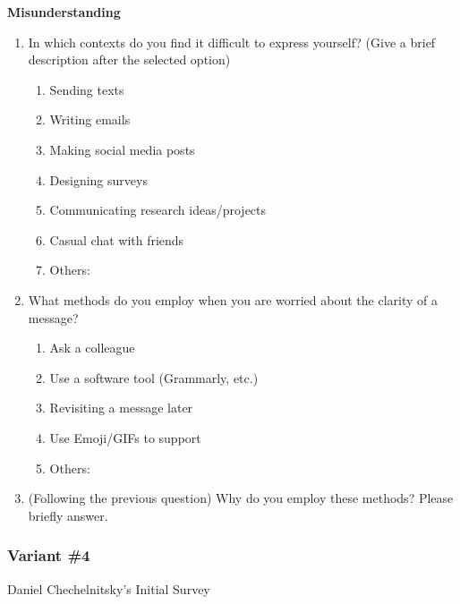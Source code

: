 \documentclass[acmsmall,screen,authorversion,nonacm]{acmart}
\begin{document}
\textbf{Misunderstanding}
\begin{enumerate}
        \item In which contexts do you find it difficult to express yourself? (Give a brief description after the selected option)
            \begin{enumerate}
                \item Sending texts
                \item Writing emails
                \item Making social media posts
                \item Designing surveys
                \item Communicating research ideas/projects
                \item Casual chat with friends
                \item Others: 
            \end{enumerate}
        \item What methods do you employ when you are worried about the clarity of a message?
            \begin{enumerate}
                \item Ask a colleague
                \item Use a software tool (Grammarly, etc.)
                \item Revisiting a message later
                \item Use Emoji/GIFs to support
                \item Others: 
            \end{enumerate}
        \item (Following the previous question) Why do you employ these methods? Please briefly answer.
\end{enumerate}

\subsubsection{Variant \#4}
\label{var4}
Daniel Chechelnitsky’s Initial Survey 
\end{document}
